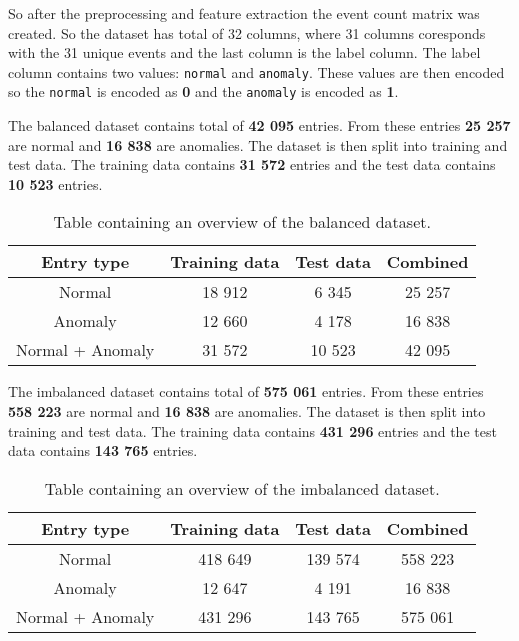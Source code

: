 So after the preprocessing and feature extraction the event count matrix was created. So the dataset has total of 32 columns, where 31 columns coresponds with the 31 unique events and the last column is the label column.
The label column contains two values: \texttt{normal} and \texttt{anomaly}. These values are then encoded so the \texttt{normal} is encoded as \textbf{0} and the \texttt{anomaly} is encoded as \textbf{1}.

The balanced dataset contains total of \textbf{42 095} entries. From these entries \textbf{25 257} are normal and \textbf{16 838} are anomalies. 
The dataset is then split into training and test data. The training data contains \textbf{31 572} entries and the test data contains \textbf{10 523} entries. 

\begin{table}[hbt]
    \centering
    \begin{tabular}{|c|c|c|c|}
    \hline
    \textbf{Entry type} & \textbf{Training data} & \textbf{Test data} & \textbf{Combined} \\ \hline
    Normal             & 18 912                           & 6 345                            & 25 257                          \\ \hline
    Anomaly              & 12 660                             & 4 178                            & 16 838                          \\ \hline
    Normal + Anomaly    & 31 572                           & 10 523                            & 42 095                          \\ \hline
    \end{tabular}
    \caption{Table containing an overview of the balanced dataset.}    
\end{table}

The imbalanced dataset contains total of \textbf{575 061} entries. From these entries \textbf{558 223} are normal and \textbf{16 838} are anomalies.
The dataset is then split into training and test data. The training data contains \textbf{431 296} entries and the test data contains \textbf{143 765} entries.

\begin{table}[hbt]
    \centering
    \begin{tabular}{|c|c|c|c|}
    \hline
    \textbf{Entry type} & \textbf{Training data} & \textbf{Test data} & \textbf{Combined} \\ \hline
    Normal             & 418 649                           & 139 574                            & 558 223                          \\ \hline
    Anomaly              & 12 647                             & 4 191                            & 16 838                          \\ \hline
    Normal + Anomaly    & 431 296                           & 143 765                            & 575 061                         \\ \hline
    \end{tabular}
    \caption{Table containing an overview of the imbalanced dataset.}    
\end{table}

